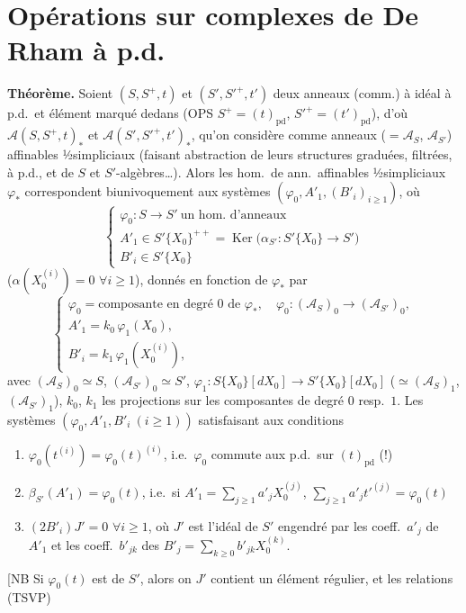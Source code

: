 \documentclass[11pt,a4paper]{article}
\begin{document}
\section{Opérations sur complexes de De Rham à p.d.}


 \textbf{Théorème.} Soient $(S,S^{+},t)$ et $(S',S'^{+},t')$ deux anneaux (comm.) à idéal à p.d.\ et élément marqué dedans (OPS $S^{+}=(t)_{\mathrm{pd}}$, $S'^{+}=(t')_{\mathrm{pd}}$), d'où $\mathcal{A}(S,S^{+},t)_{*}$ et $\mathcal{A}(S',S'^{+},t')_{*}$, qu'on considère comme anneaux ($=\mathcal{A}_{S}$, $\mathcal{A}_{S'}$) affinables ½simpliciaux (faisant abstraction de leurs structures graduées, filtrées, à p.d., et de $S$ et $S'$-algèbres…). Alors les hom.\ de ann.\ affinables ½simpliciaux $\varphi_{*}$ correspondent biunivoquement aux systèmes $(\varphi_{0}, A'_{1}, (B'_{i})_{i\geq 1})$, où
\[
\begin{cases}
\varphi_{0}\colon S\to S' \ \text{un hom.\ d'anneaux}\\
A'_{1}\in S'\{X_{0}\}^{++}=\operatorname{Ker}\bigl(\alpha_{S'}\colon S'\{X_{0}\}\to S'\bigr)\\
B'_{i}\in S'\{X_{0}\}
\end{cases}
\]
($\alpha(X_{0}^{(i)})=0$ $\forall i\geq 1$), donnés en fonction de $\varphi_{*}$ par
\[
\begin{cases}
\varphi_{0} = \text{composante en degré } 0 \text{ de } \varphi_{*},\quad
\varphi_{0}\colon (\mathcal{A}_{S})_{0}\to(\mathcal{A}_{S'})_{0},\\
A'_{1} = k_{0}\,\varphi_{1}(X_{0}),\\
B'_{i} = k_{1}\,\varphi_{1}(X_{0}^{(i)}),
\end{cases}
\]
avec $(\mathcal{A}_{S})_{0}\simeq S$, $(\mathcal{A}_{S'})_{0}\simeq S'$, $\varphi_{1}\colon S\{X_{0}\}[dX_{0}]\to S'\{X_{0}\}[dX_{0}]$ (${}\simeq(\mathcal{A}_{S})_{1}$, $(\mathcal{A}_{S'})_{1}$), $k_{0}$, $k_{1}$ les projections sur les composantes de degré $0$ resp.\ $1$. Les systèmes $(\varphi_{0}, A'_{1}, B'_{i}\ (i\geq 1))$ satisfaisant aux conditions
\begin{enumerate}
  \item \struck{\ill{}} $\varphi_{0}(t^{(i)})=\varphi_{0}(t)^{(i)}$, i.e.\ $\varphi_{0}$ commute aux p.d.\ sur $(t)_{\mathrm{pd}}$ (!)
  \item $\beta_{S'}(A'_{1})=\varphi_{0}(t)$, i.e.\ si $A'_{1}=\sum_{j\geq 1}a'_{j}X_{0}^{(j)}$, $\sum_{j\geq 1}a'_{j}t'^{(j)}=\varphi_{0}(t)$
  \item $(2B'_{i})J'=0$ \struck{$(\forall\ldots)$} $\forall i\geq 1$, où $J'$ est l'idéal de $S'$ engendré par les coeff.\ $a'_{j}$ de $A'_{1}$ et les coeff.\ $b'_{jk}$ des $B'_{j}=\sum_{k\geq 0}b'_{jk}X_{0}^{(k)}$.
\end{enumerate}
[NB Si $\varphi_{0}(t)$ est   de $S'$, alors on   $J'$ contient un élément régulier, et les relations (TSVP)
\end{document}
